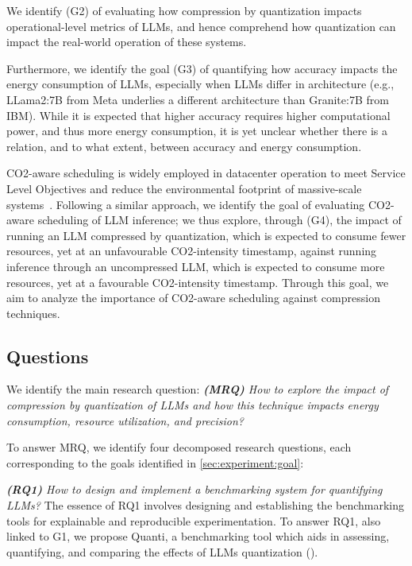 We identify (G2) of evaluating how compression by quantization impacts operational-level metrics of LLMs, and hence comprehend how quantization can impact the real-world operation of these systems. 

Furthermore, we identify the goal 
(G3) of quantifying how accuracy impacts the energy consumption of LLMs, especially when LLMs differ in architecture (e.g., LLama2:7B from Meta underlies a different architecture than Granite:7B from IBM). While it is expected that higher accuracy requires higher computational power, and thus more energy consumption, it is yet unclear whether there is a relation, and to what extent, between accuracy and energy consumption. 

CO2-aware scheduling is widely employed in datacenter operation to meet Service Level Objectives and reduce the environmental footprint of massive-scale systems~\cite{DBLP:journals/corr/abs-2206-03259, nicolae5377101m3sa, DBLP:conf/wosp/NiewenhuisTIM24}. Following a similar approach, we identify the goal of evaluating CO2-aware scheduling of LLM inference; we thus explore, through (G4), the impact of running an LLM compressed by quantization, which is expected to consume fewer resources, yet at an unfavourable CO2-intensity timestamp, against running inference through an uncompressed LLM, which is expected to consume more resources, yet at a favourable CO2-intensity timestamp. Through this goal, we aim to analyze the importance of CO2-aware scheduling against compression techniques.


\subsection{Questions}\label{sec:experiment:questions}

We identify the main research question: \textit{\textbf{(MRQ)} How to explore the impact of compression by quantization of LLMs and how this technique impacts energy consumption, resource utilization, and precision?}

To answer MRQ, we identify four decomposed research questions, each corresponding to the goals identified in \ref{sec:experiment:goal}:

\textit{\textbf{(RQ1)} How to design and implement a benchmarking system for quantifying LLMs?} The essence of RQ1 involves designing and establishing the benchmarking tools for explainable and reproducible experimentation. To answer RQ1, also linked to G1, we propose Quanti, a benchmarking tool which aids in assessing, quantifying, and comparing the effects of LLMs quantization ().

